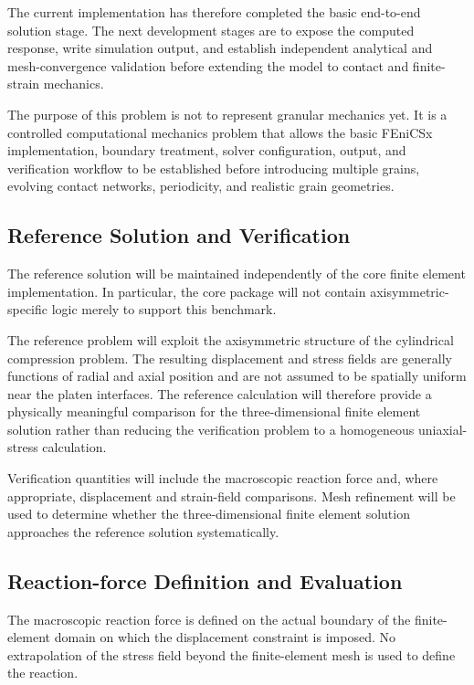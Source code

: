The current implementation has therefore completed the basic
end-to-end solution stage. The next development stages are to expose
the computed response, write simulation output, and establish independent
analytical and mesh-convergence validation before extending the model to
contact and finite-strain mechanics.

The purpose of this problem is not to represent granular mechanics yet. It is a controlled computational mechanics problem that allows the basic FEniCSx implementation, boundary treatment, solver configuration, output, and verification workflow to be established before introducing multiple grains, evolving contact networks, periodicity, and realistic grain geometries.

\subsection{Reference Solution and Verification}

The reference solution will be maintained independently of the core finite element implementation. In particular, the core package will not contain axisymmetric-specific logic merely to support this benchmark.

The reference problem will exploit the axisymmetric structure of the cylindrical compression problem. The resulting displacement and stress fields are generally functions of radial and axial position and are not assumed to be spatially uniform near the platen interfaces. The reference calculation will therefore provide a physically meaningful comparison for the three-dimensional finite element solution rather than reducing the verification problem to a homogeneous uniaxial-stress calculation.

Verification quantities will include the macroscopic reaction force and, where appropriate, displacement and strain-field comparisons. Mesh refinement will be used to determine whether the three-dimensional finite element solution approaches the reference solution systematically.

\subsection{Reaction-force Definition and Evaluation}

The macroscopic reaction force is defined on the actual boundary of the finite-element domain on which the displacement constraint is imposed. No extrapolation of the stress field beyond the finite-element mesh is used to define the reaction.

